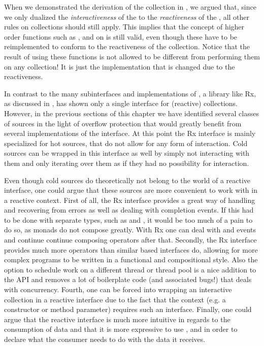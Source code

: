 When we demonstrated the derivation of the \obs collection in , we argued that, since we only dualized the \textit{interactiveness} of the \ieb to the \textit{reactiveness} of the \obs, all other rules on collections should still apply. This implies that the concept of higher order functions such as ,  and  on \ieb is still valid, even though these have to be reimplemented to conform to the reactiveness of the \obs collection. Notice that the result of using these functions is not allowed to be different from performing them on any \ieb collection! It is just the implementation that is changed due to the reactiveness.

In contrast to the many subinterfaces and implementations of \itb, a library like Rx, as discussed in , has shown only a single interface for (reactive) collections. However, in the previous sections of this chapter we have identified several classes of sources in the light of overflow protection that would greatly benefit from several implementations of the \obs interface. At this point the Rx interface is mainly specialized for hot sources, that do not allow for any form of interaction. Cold sources can be wrapped in this interface as well by simply not interacting with them and only iterating over them as if they had no possibility for interaction.

Even though cold sources do theoretically not belong to the world of a reactive interface, one could argue that these sources are more convenient to work with in a reactive context. First of all, the Rx interface provides a great way of handling and recovering from errors as well as dealing with completion events. If this had to be done with separate types, such as  and , it would be too much of a pain to do so, as monads do not compose greatly. With Rx one can deal with  and  events and continue continue composing operators after that. Secondly, the Rx interface provides much more operators than similar \itb based interfaces do, allowing for more complex programs to be written in a functional and compositional style. Also the option to schedule work on a different thread or thread pool is a nice addition to the API and removes a lot of boilerplate code (and associated bugs!) that deals with concurrency. Fourth, one can be forced into wrapping an interactive collection in a reactive interface due to the fact that the context (e.g. a constructor or method parameter) requires such an interface. Finally, one could argue that the reactive interface is much more intuitive in regards to the consumption of data and that it is more expressive to use ,  and  in order to declare what the consumer needs to do with the data it receives.

